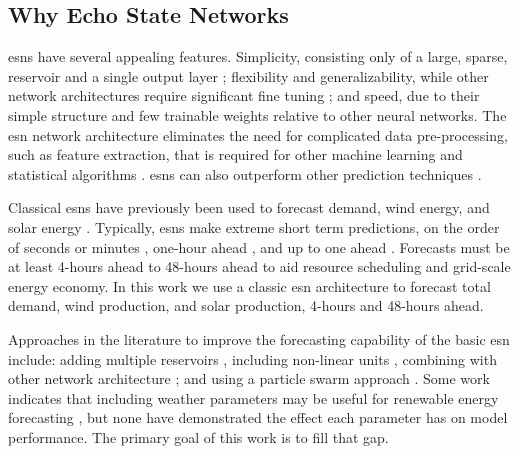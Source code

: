 \subsection{Why Echo State Networks}
\glspl{esn} have several appealing features. Simplicity, consisting only
of a large, sparse, reservoir and a single output layer
\cite{lukosevicius_practical_2012}; flexibility and generalizability,
while other network architectures require significant fine tuning
\cite{liu_deterministic_2019}; and speed, due to their simple structure and
few trainable weights relative to other neural networks. The \gls{esn} network
architecture eliminates the need for complicated data pre-processing, such as
feature extraction, that is required for other machine learning  and statistical
algorithms \cite{lazos_optimisation_2014, chen_day-ahead_2017}.
\glspl{esn} can also outperform other prediction techniques
\cite{jayawardene_comparison_2014,jayawardene_comparison_2015,shi_energy_2016,chitsazan_wind_2019, hu_forecasting_2020}.

Classical \glspl{esn} have previously been used to forecast demand, wind
energy, and solar energy
\cite{deihimi_application_2012,jayawardene_comparison_2015,hu_forecasting_2020}.
Typically, \glspl{esn} make extreme short term predictions, on the
order of seconds or minutes
\cite{chen_novel_2019,wang_echo_2019,chitsazan_wind_2019}, one-hour ahead
\cite{shi_energy_2016}, and up to one ahead
\cite{deihimi_application_2012}. Forecasts must be at least 4-hours ahead
\cite{wang_quantifying_2016} to 48-hours ahead
\cite{wang_quantifying_2016,mc_garrigle_quantifying_2015,brancucci_martinez-anido_value_2016}
to aid resource scheduling and grid-scale energy economy. In this work we use
a classic \gls{esn} architecture to forecast total demand, wind production, and
solar production, 4-hours and 48-hours ahead.

Approaches in the literature to improve the forecasting capability of
the basic \gls{esn} include: adding multiple reservoirs
\cite{hu_forecasting_2020,gallicchio_deep_2019,yao_novel_2019,li_multi-reservoir_2020}, including non-linear units \cite{holzmann_echo_2008, chitsazan_wind_2019}, combining with other network architecture
\cite{chen_novel_2019, lopez_wind_2018}; and using a particle swarm approach
\cite{chouikhi_pso-based_2017,wang_echo_2019}. Some work indicates that
including weather parameters may be useful for renewable energy forecasting
\cite{li_echo_2019,chitsazan_wind_2019}, but none have demonstrated the effect
each parameter has on model performance. The primary goal of this work
is to fill that gap.

